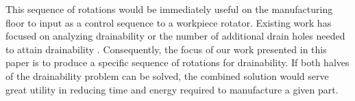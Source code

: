 This sequence of rotations would be immediately useful on the manufacturing floor to input as a control sequence to a workpiece rotator. Existing work has focused on analyzing drainability \cite{Yasui2011} or the number of additional drain holes needed to attain drainability \cite{Aloupis_draininga}. Consequently, the focus of our work presented in this paper is to produce a specific sequence of rotations for drainability. If both halves of the drainability problem can be solved, the combined solution would serve great utility in reducing time and energy required to manufacture a given part.

